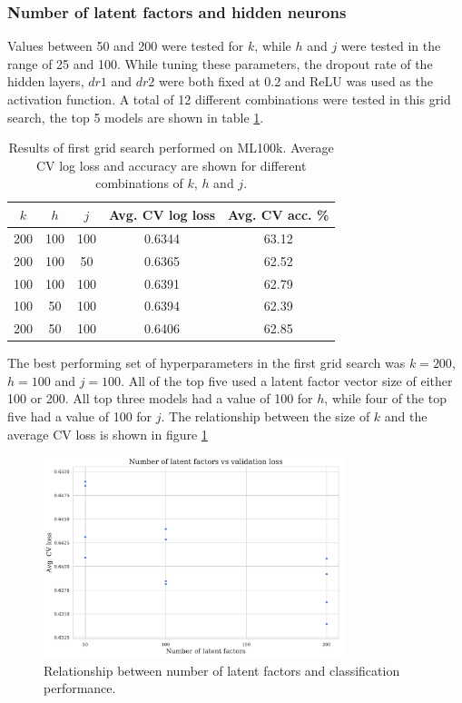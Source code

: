 \subsubsection{Number of latent factors and hidden neurons}
Values between 50 and 200 were tested for $k$, while $h$ and $j$ were tested in the range of 25 and 100. While tuning these parameters, the dropout rate of the hidden layers, $dr1$ and $dr2$ were both fixed at 0.2 and ReLU was used as the activation function. A total of 12 different combinations were tested in this grid search, the top 5 models are shown in table \ref{tab:ml100k-grid-results1}.

\begin{table}[H]
\centering
\begin{tabular}{c | c | c | c | c}
\toprule
\textbf{$k$} & \textbf{$h$} & \textbf{$j$} & \textbf{Avg. CV log loss} & \textbf{Avg. CV acc.} \% \\
\midrule
200 & 100 & 100 & 0.6344 & 63.12 \\
\midrule
200 & 100 & 50 & 0.6365 & 62.52 \\
\midrule
100 & 100 & 100 & 0.6391 & 62.79 \\
\midrule
100 & 50 & 100 & 0.6394 & 62.39 \\
\midrule
200 & 50 & 100 & 0.6406 & 62.85 \\
\bottomrule
\end{tabular}
\caption[MovieLens 100k grid search results -- number of nodes]{Results of first grid search performed on ML100k. Average CV log loss and accuracy are shown for different combinations of $k$, $h$ and $j$.}
\label{tab:ml100k-grid-results1}
\end{table}

The best performing set of hyperparameters in the first grid search was $k=200$, $h=100$ and $j=100$. All of the top five used a latent factor vector size of either 100 or 200. All top three models had a value of 100 for $h$, while four of the top five had a value of 100 for $j$. The relationship between the size of $k$ and the average CV loss is shown in figure \ref{fig:5-latent-size}

\begin{figure}[H]
\centering
\includegraphics[width=0.78\textwidth]{Figures/5_ml100k-latent-factors.pdf}
\decoRule
\caption[Number of latent factors vs classification accuracy]{Relationship between number of latent factors and classification performance.}
\label{fig:5-latent-size}
\end{figure}


